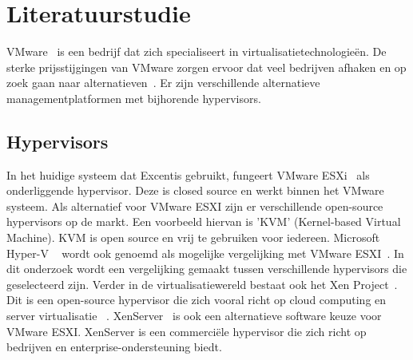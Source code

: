 




\section{Literatuurstudie}
\label{sec:literatuurstudie}
VMware~\autocite{vmware} is een bedrijf dat zich specialiseert in virtualisatietechnologieën. De sterke prijsstijgingen van VMware zorgen ervoor dat veel bedrijven afhaken en op zoek gaan naar alternatieven~\autocite{Hale2024}. Er zijn verschillende alternatieve managementplatformen met bijhorende hypervisors.

\subsection{Hypervisors}
In het huidige systeem dat Excentis gebruikt, fungeert VMware ESXi~\autocite{vmware} als onderliggende hypervisor. Deze is closed source en werkt binnen het VMware systeem. Als alternatief voor VMware ESXI zijn er verschillende open-source hypervisors op de markt.
Een voorbeeld hiervan is 'KVM' (Kernel-based Virtual Machine)\autocite{KVM}. KVM is open source en vrij te gebruiken voor iedereen\autocite{KVM}. Microsoft Hyper-V ~\autocite{Eaton2019} wordt ook genoemd als mogelijke vergelijking met VMware ESXI~\autocite{fayyad2013benchmarking}. In dit onderzoek wordt een vergelijking gemaakt tussen verschillende hypervisors die geselecteerd zijn.
Verder in de virtualisatiewereld bestaat ook het Xen Project~\autocite{xenproject}. Dit is een open-source hypervisor die zich vooral richt op cloud computing en server virtualisatie ~\autocite{binu2011virtualization}.
XenServer~\autocite{xencenter2024} is ook een alternatieve software keuze voor VMware ESXI. XenServer is een commerciële hypervisor die zich richt op bedrijven en enterprise-ondersteuning biedt.

